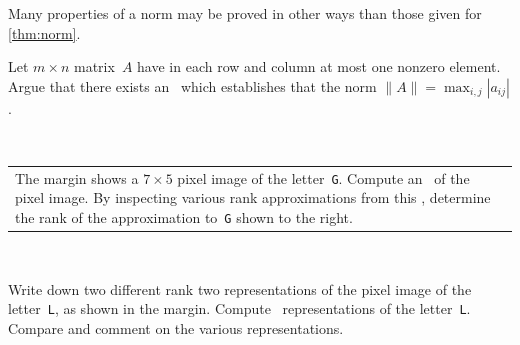 \begin{exercise} \label{ex:norm} 
Many properties of a norm may be proved in other ways than those given for \cref{thm:norm}.
\end{exercise}




\begin{exercise}  
Let \(m\times n\) matrix~\(A\) have in each row and column at most one nonzero element.
Argue that there exists an \svd\ which establishes that the norm \(\|A\|=\max_{i,j}|a_{ij}|\).
\end{exercise}



\begin{exercise}  \ 
\marginpar{}\\%
\begin{tabular}{@{}ll@{}}
\parbox[b]{0.8\linewidth}{
The margin shows a \(7\times5\) pixel image of the letter~\texttt{G}.
Compute an \svd\ of the pixel image.
By inspecting various rank approximations from this \svd, determine the rank of the approximation to~\texttt{G} shown to the right.
}&
 
\end{tabular}\\
\end{exercise}




\begin{exercise} 
Write down two different rank two representations of the pixel image of the letter~\verb|L|, as shown in the margin.
\marginpar{}%
Compute \svd\ representations of the letter~\verb|L|.  
Compare and comment on the various representations.
\end{exercise}


